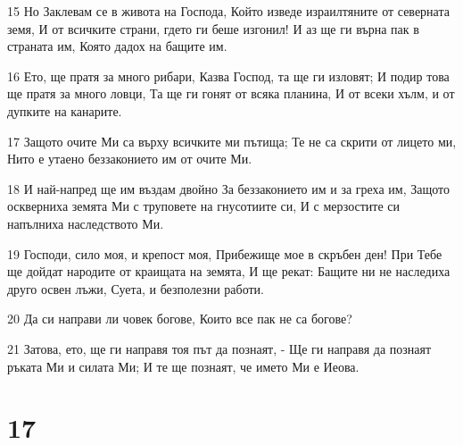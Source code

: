 \par 15 Но Заклевам се в живота на Господа, Който изведе израилтяните от северната земя, И от всичките страни, гдето ги беше изгонил! И аз ще ги върна пак в страната им, Която дадох на бащите им.
\par 16 Ето, ще пратя за много рибари, Казва Господ, та ще ги изловят; И подир това ще пратя за много ловци, Та ще ги гонят от всяка планина, И от всеки хълм, и от дупките на канарите.
\par 17 Защото очите Ми са върху всичките ми пътища; Те не са скрити от лицето ми, Нито е утаено беззаконието им от очите Ми.
\par 18 И най-напред ще им въздам двойно За беззаконието им и за греха им, Защото оскверниха земята Ми с труповете на гнусотиите си, И с мерзостите си напълниха наследството Ми.
\par 19 Господи, сило моя, и крепост моя, Прибежище мое в скръбен ден! При Тебе ще дойдат народите от краищата на земята, И ще рекат: Бащите ни не наследиха друго освен лъжи, Суета, и безполезни работи.
\par 20 Да си направи ли човек богове, Които все пак не са богове?
\par 21 Затова, ето, ще ги направя тоя път да познаят, - Ще ги направя да познаят ръката Ми и силата Ми; И те ще познаят, че името Ми е Иеова.

\chapter{17}


